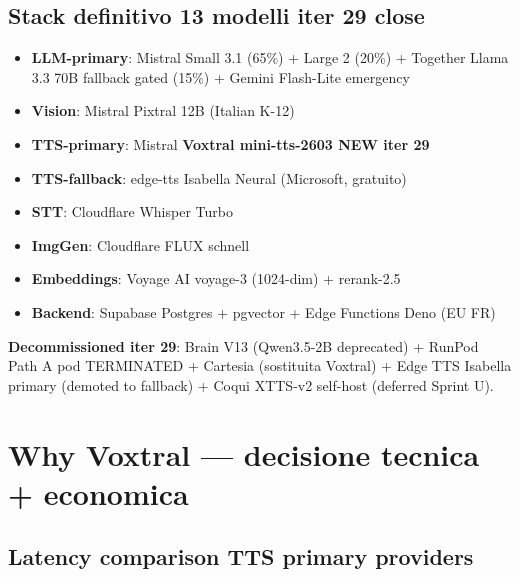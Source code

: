 \documentclass[12pt,a4paper]{article}
\begin{document}
\subsection*{Stack definitivo 13 modelli iter 29 close}

\begin{itemize}[leftmargin=*]
  \item \textbf{LLM-primary}: Mistral Small 3.1 (65\%) + Large 2 (20\%) + Together Llama 3.3 70B fallback gated (15\%) + Gemini Flash-Lite emergency
  \item \textbf{Vision}: Mistral Pixtral 12B (Italian K-12)
  \item \textbf{TTS-primary}: Mistral \textbf{Voxtral mini-tts-2603 NEW iter 29}
  \item \textbf{TTS-fallback}: edge-tts Isabella Neural (Microsoft, gratuito)
  \item \textbf{STT}: Cloudflare Whisper Turbo
  \item \textbf{ImgGen}: Cloudflare FLUX schnell
  \item \textbf{Embeddings}: Voyage AI voyage-3 (1024-dim) + rerank-2.5
  \item \textbf{Backend}: Supabase Postgres + pgvector + Edge Functions Deno (EU FR)
\end{itemize}

\textbf{Decommissioned iter 29}: Brain V13 (Qwen3.5-2B deprecated) + RunPod Path A pod TERMINATED + Cartesia (sostituita Voxtral) + Edge TTS Isabella primary (demoted to fallback) + Coqui XTTS-v2 self-host (deferred Sprint U).

\newpage

\section{Why Voxtral --- decisione tecnica + economica}

\subsection{Latency comparison TTS primary providers}

\begin{center}
\end{center}
\end{document}

